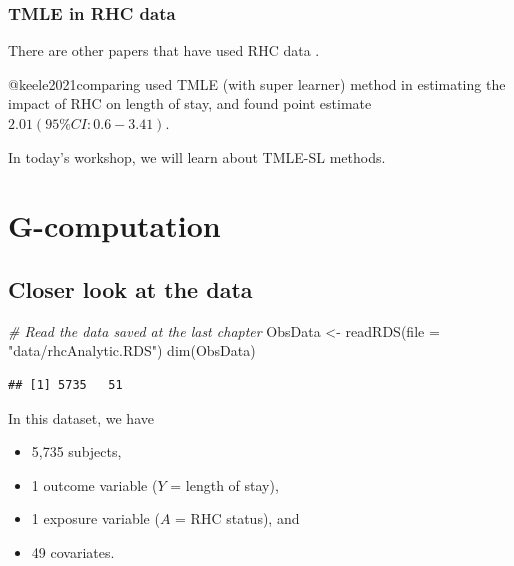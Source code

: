 \documentclass[
]{book}
\newenvironment{Shaded}{\begin{snugshade}}{\end{snugshade}}
\newcommand{\AttributeTok}[1]{\textcolor[rgb]{0.77,0.63,0.00}{#1}}
\newcommand{\CommentTok}[1]{\textcolor[rgb]{0.56,0.35,0.01}{\textit{#1}}}
\newcommand{\FunctionTok}[1]{\textcolor[rgb]{0.00,0.00,0.00}{#1}}
\newcommand{\NormalTok}[1]{#1}
\newcommand{\OtherTok}[1]{\textcolor[rgb]{0.56,0.35,0.01}{#1}}
\newcommand{\StringTok}[1]{\textcolor[rgb]{0.31,0.60,0.02}{#1}}
\providecommand{\tightlist}{%
  \setlength{\itemsep}{0pt}\setlength{\parskip}{0pt}}
\begin{document}
\hypertarget{tmle-in-rhc-data}{%
\subsection{TMLE in RHC data}\label{tmle-in-rhc-data}}

There are other papers that have used RHC data \citep{keele2021comparing, keele2018pre}.

\begin{rmdcomment}
@keele2021comparing used TMLE (with super learner) method in estimating
the impact of RHC on length of stay, and found point estimate
\(2.01 (95\% CI: 0.6-3.41)\).
\end{rmdcomment}

In today's workshop, we will learn about TMLE-SL methods.

\hypertarget{g-computation}{%
\chapter{G-computation}\label{g-computation}}

\hypertarget{closer-look-at-the-data}{%
\section{Closer look at the data}\label{closer-look-at-the-data}}

\begin{Shaded}
\begin{Highlighting}[]
\CommentTok{\# Read the data saved at the last chapter}
\NormalTok{ObsData }\OtherTok{\textless{}{-}} \FunctionTok{readRDS}\NormalTok{(}\AttributeTok{file =} \StringTok{"data/rhcAnalytic.RDS"}\NormalTok{)}
\FunctionTok{dim}\NormalTok{(ObsData)}
\end{Highlighting}
\end{Shaded}

\begin{verbatim}
## [1] 5735   51
\end{verbatim}

In this dataset, we have

\begin{itemize}
\tightlist
\item
  5,735 subjects,
\item
  1 outcome variable (\(Y\) = length of stay),
\item
  1 exposure variable (\(A\) = RHC status), and
\item
  49 covariates.
\end{itemize}
\end{document}
